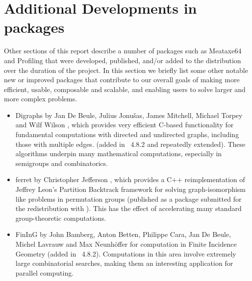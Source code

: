 \section{Additional Developments in \GAP packages} \label{sec:packages}

Other sections of this report describe
a number of \GAP packages such as Meataxe64 and Profiling that were developed, published,
and/or added to the \GAP distribution over the duration of the project.  In this section
we briefly list some other notable new or improved packages that
contribute to our overall goals of making \GAP more efficient, usable,
composable and scalable, and enabling users to solve larger and more
complex problems.

\begin{itemize}


\item
{\sf Digraphs} by Jan De Beule, Julius Jonu\v{s}as, James Mitchell,
Michael Torpey and Wilf Wilson \cite{Digraphs}, which provides very efficient C-based
functionality for fundamental computations with directed and
undirected graphs, including those with multiple edges. (added in
\GAP~4.8.2 and repeatedly extended).  These algorithms underpin many
mathematical computations, especially in semigroups and combinatorics.

\item
{\sf ferret} by Christopher Jefferson \cite{ferret}, which provides a C++
reimplementation of Jeffrey Leon's Partition Backtrack framework for
solving graph-isomorphism like problems in permutation groups
(published as a package submitted for the redistribution with
\GAP). This has the effect of accelerating many standard
group-theoretic computations.

\item
{\sf FinInG} by John Bamberg, Anton Betten, Philippe Cara, Jan De
Beule, Michel Lavrauw and Max Neunh\"offer \cite{fining} for computation in Finite
Incidence Geometry (added in \GAP~4.8.2). Computations in this area
involve extremely large combinatorial searches, making them an
interesting application for parallel computing.


\end{itemize}
